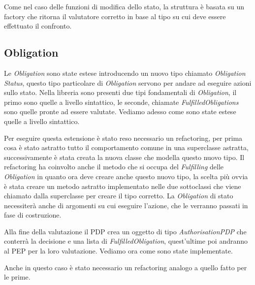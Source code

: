 Come nel caso delle funzioni di modifica dello stato, la struttura è basata su un factory che ritorna il valutatore corretto in base al tipo su cui deve essere effettuato il confronto.

\subsection{Obligation}
\label{sub:estensione_obligation}
Le \textit{Obligation} sono state estese introducendo un nuovo tipo chiamato \textit{Obligation Status}, questo tipo particolare di \textit{Obligation} servono per andare ad eseguire azioni sullo stato.
Nella libreria sono presenti due tipi fondamentali di \textit{Obligation}, il primo sono quelle a livello sintattico, le seconde, chiamate \textit{FulfilledObligations} sono quelle pronte ad essere valutate. Vediamo adesso come sono state estese quelle a livello sintattico.\\ \par
Per eseguire questa estensione è stato reso necessario un refactoring, per prima cosa è stato astratto tutto il comportamento comune in una superclasse astratta, successivamente è stata creata la nuova classe che modella questo nuovo tipo.
Il refactoring ha coinvolto anche il metodo che si occupa del \textit{Fulfilling} delle \textit{Obligation} in quanto ora deve creare anche questo nuovo tipo, la scelta più ovvia è stata creare un metodo astratto implementato nelle due sottoclassi che viene chiamato dalla superclasse per creare il tipo corretto.
La \textit{Obligation} di stato necessiterà anche di argomenti su cui eseguire l'azione, che le verranno passati in fase di costruzione.\\ \par
Alla fine della valutazione il \ac{PDP} crea un oggetto di tipo \textit{AuthorisationPDP} che conterrà la decisione e una lista di \textit{FulfilledObligation}, quest'ultime poi andranno al \ac{PEP} per la loro valutazione. Vediamo ora come sono state implementate.\\ \par
Anche in questo caso è stato necessario un refactoring analogo a quello fatto per le prime.
